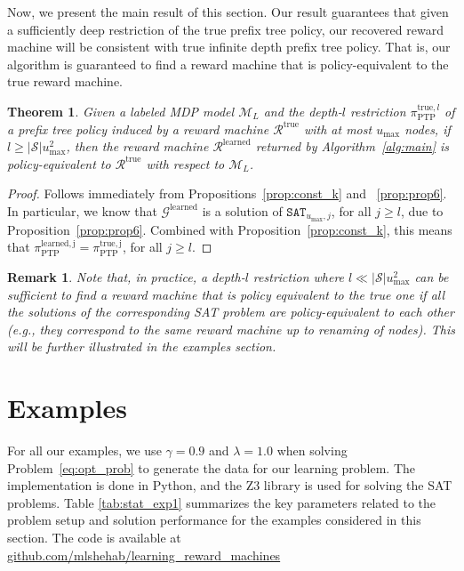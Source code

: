 \documentclass[letterpaper, 10 pt, conference]{ieeeconf}
\newtheorem{theorem}{\textbf{Theorem}}
\newcommand{\ptp}{\pi_{\mathrm{PTP}}}
\newtheorem{remark}{\textbf{Remark}}
\begin{document}
Now, we present the main result of this section. Our result guarantees that given a sufficiently deep restriction of the true prefix tree policy, our recovered reward machine will be consistent with true infinite depth prefix tree policy. That is, our algorithm is guaranteed to find a reward machine that is policy-equivalent to the true reward machine.
\begin{theorem}\label{thm:thm_major}
{
    Given a labeled MDP model $\mathcal{M}_L$ and the depth-$l$ restriction $\ptp^{\mathrm{true},l}$ of a prefix tree policy induced by a reward machine $\mathcal{R}^{\mathrm{true}}$ with at most $u_{\mathrm{max}}$ nodes, if $l\geq|\mathcal{S}|u_{\mathrm{max}}^2$, then the reward machine $\mathcal{R}^{\mathrm{learned}}$ returned by Algorithm~\ref{alg:main} is policy-equivalent to $\mathcal{R}^{\mathrm{true}}$ with respect to $\mathcal{M}_L$.
    }
\end{theorem}
\begin{proof}
   Follows immediately from Propositions~\ref{prop:const_k} and ~\ref{prop:prop6}. In particular, we know that $\mathcal{G}^{\mathrm{learned}}$ is a solution of $\texttt{SAT}_{u_\mathrm{max},j}$, for all $j \geq l$, due to Proposition~\ref{prop:prop6}. Combined with Proposition~\ref{prop:const_k}, this means that $\ptp^{\mathrm{learned,j}} =\ptp^{\mathrm{true,j}}$, for all $j \geq l$. 
\end{proof}
\begin{remark}
Note that, in practice, a depth-$l$ restriction where  $l\ll|\mathcal{S}|u_{\mathrm{max}}^2$ can be sufficient to find a reward machine that is policy equivalent to the true one if all the solutions of the corresponding SAT problem are policy-equivalent to each other (e.g., they correspond to the same reward machine up to renaming of nodes). This will be further illustrated in the examples section.
\end{remark}


\section{Examples}
For all our examples, we use $\gamma = 0.9$ and $\lambda = 1.0$ when solving Problem~\eqref{eq:opt_prob} to generate the data for our learning problem. The implementation is done in Python, and the Z3 library \cite{de2008z3} is used for solving the SAT problems. Table \ref{tab:stat_exp1} summarizes the key parameters related to the problem setup and solution performance for the examples considered in this section. The code is available at \href{https://2ly.link/23uDo}{github.com/mlshehab/learning\_reward\_machines}
\end{document}

